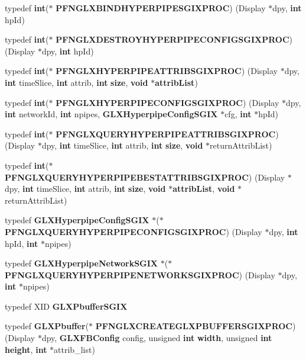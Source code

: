 \begin{DoxyCompactItemize}
\item 
typedef {\bf int}($\ast$ {\bf P\+F\+N\+G\+L\+X\+B\+I\+N\+D\+H\+Y\+P\+E\+R\+P\+I\+P\+E\+S\+G\+I\+X\+P\+R\+OC}) (Display $\ast$dpy, {\bf int} hp\+Id)
\item 
typedef {\bf int}($\ast$ {\bf P\+F\+N\+G\+L\+X\+D\+E\+S\+T\+R\+O\+Y\+H\+Y\+P\+E\+R\+P\+I\+P\+E\+C\+O\+N\+F\+I\+G\+S\+G\+I\+X\+P\+R\+OC}) (Display $\ast$dpy, {\bf int} hp\+Id)
\item 
typedef {\bf int}($\ast$ {\bf P\+F\+N\+G\+L\+X\+H\+Y\+P\+E\+R\+P\+I\+P\+E\+A\+T\+T\+R\+I\+B\+S\+G\+I\+X\+P\+R\+OC}) (Display $\ast$dpy, {\bf int} time\+Slice, {\bf int} attrib, {\bf int} {\bf size}, {\bf void} $\ast${\bf attrib\+List})
\item 
typedef {\bf int}($\ast$ {\bf P\+F\+N\+G\+L\+X\+H\+Y\+P\+E\+R\+P\+I\+P\+E\+C\+O\+N\+F\+I\+G\+S\+G\+I\+X\+P\+R\+OC}) (Display $\ast$dpy, {\bf int} network\+Id, {\bf int} npipes, {\bf G\+L\+X\+Hyperpipe\+Config\+S\+G\+IX} $\ast$cfg, {\bf int} $\ast$hp\+Id)
\item 
typedef {\bf int}($\ast$ {\bf P\+F\+N\+G\+L\+X\+Q\+U\+E\+R\+Y\+H\+Y\+P\+E\+R\+P\+I\+P\+E\+A\+T\+T\+R\+I\+B\+S\+G\+I\+X\+P\+R\+OC}) (Display $\ast$dpy, {\bf int} time\+Slice, {\bf int} attrib, {\bf int} {\bf size}, {\bf void} $\ast$return\+Attrib\+List)
\item 
typedef {\bf int}($\ast$ {\bf P\+F\+N\+G\+L\+X\+Q\+U\+E\+R\+Y\+H\+Y\+P\+E\+R\+P\+I\+P\+E\+B\+E\+S\+T\+A\+T\+T\+R\+I\+B\+S\+G\+I\+X\+P\+R\+OC}) (Display $\ast$dpy, {\bf int} time\+Slice, {\bf int} attrib, {\bf int} {\bf size}, {\bf void} $\ast${\bf attrib\+List}, {\bf void} $\ast$return\+Attrib\+List)
\item 
typedef {\bf G\+L\+X\+Hyperpipe\+Config\+S\+G\+IX} $\ast$($\ast$ {\bf P\+F\+N\+G\+L\+X\+Q\+U\+E\+R\+Y\+H\+Y\+P\+E\+R\+P\+I\+P\+E\+C\+O\+N\+F\+I\+G\+S\+G\+I\+X\+P\+R\+OC}) (Display $\ast$dpy, {\bf int} hp\+Id, {\bf int} $\ast$npipes)
\item 
typedef {\bf G\+L\+X\+Hyperpipe\+Network\+S\+G\+IX} $\ast$($\ast$ {\bf P\+F\+N\+G\+L\+X\+Q\+U\+E\+R\+Y\+H\+Y\+P\+E\+R\+P\+I\+P\+E\+N\+E\+T\+W\+O\+R\+K\+S\+G\+I\+X\+P\+R\+OC}) (Display $\ast$dpy, {\bf int} $\ast$npipes)
\item 
typedef X\+ID {\bf G\+L\+X\+Pbuffer\+S\+G\+IX}
\item 
typedef {\bf G\+L\+X\+Pbuffer}($\ast$ {\bf P\+F\+N\+G\+L\+X\+C\+R\+E\+A\+T\+E\+G\+L\+X\+P\+B\+U\+F\+F\+E\+R\+S\+G\+I\+X\+P\+R\+OC}) (Display $\ast$dpy, {\bf G\+L\+X\+F\+B\+Config} config, unsigned {\bf int} {\bf width}, unsigned {\bf int} {\bf height}, {\bf int} $\ast$attrib\+\_\+list)

\end{DoxyCompactItemize}
